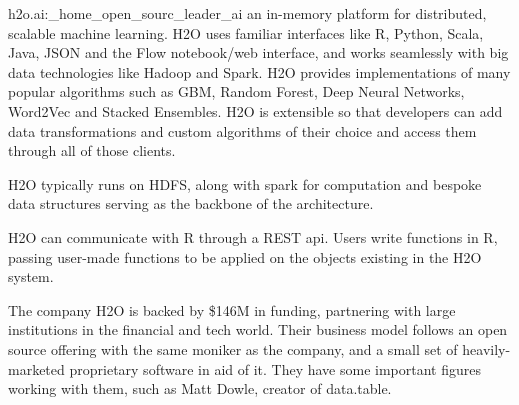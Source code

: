 \documentclass[10pt,a4paper]{article}
\begin{document}
\begin{displaycquote}{h2o.ai:_home_open_sourc_leader_ai}
  an in-memory platform for distributed, scalable machine learning.
  H2O uses familiar interfaces like R, Python, Scala, Java, JSON and
  the Flow notebook/web interface, and works seamlessly with big data
  technologies like Hadoop and Spark. H2O provides implementations of
  many popular algorithms such as GBM, Random Forest, Deep Neural
  Networks, Word2Vec and Stacked Ensembles. H2O is extensible so that
  developers can add data transformations and custom algorithms of
  their choice and access them through all of those clients.
\end{displaycquote}

H2O typically runs on HDFS, along with spark for computation and
bespoke data structures serving as the backbone of the architecture.

H2O can communicate with R through a REST api. Users write functions
in R, passing user-made functions to be applied on the objects
existing in the H2O system\cite{h2o.ai:_h2o}.

The company H2O is backed by \$146M in funding, partnering with large
institutions in the financial and tech world. Their business model
follows an open source offering with the same moniker as the company,
and a small set of heavily-marketed proprietary software in aid of it.
They have some important figures working with them, such as Matt
Dowle, creator of data.table.

\printbibliography{}
\end{document}

